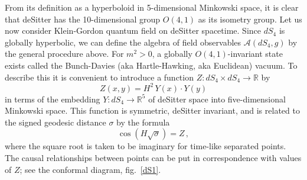 \documentclass[12pt]{article}
\newcommand{\eA}{\mathscr{A}}
\newcommand{\mr}{\mathbb{R}}
\theoremstyle{plain}
\theoremstyle{definition}
\def\ben{\begin{equation}}
\def\een{\end{equation}}
\begin{document}
From its definition as a hyperboloid in 5-dimensional Minkowski space,
it is clear that deSitter has the 10-dimensional group $O(4,1)$ as its isometry
group.
Let us now consider Klein-Gordon quantum field on deSitter
spacetime. Since $dS_4$ is globally hyperbolic, we can define the algebra of field observables $\eA(dS_4,g)$
by the general procedure above. For $m^2 > 0$, a globally $O(4,1)$-invariant state exists
called the Bunch-Davies (aka Hartle-Hawking, aka Euclidean) vacuum. To describe this
it is convenient to introduce a function $Z: dS_4 \times dS_4 \to \mr$
by
\ben\label{Zdef}
Z(x,y) = H^{2}\, Y(x) \cdot Y(y)
\een
in terms of the embedding $Y:dS_4 \to \mr^5$ of deSitter space into
five-dimensional Minkowski space. This function is symmetric, deSitter
invariant, and is related to the signed geodesic distance $\sigma$ by the formula
\ben\label{zsigma}
\cos(H \sqrt{\sigma}) = Z \, ,
\een
where the square root is taken to be imaginary for time-like separated points.
The causal relationships between points can be put in correspondence with values of
$Z$; see the conformal diagram, fig.~\ref{dS1}.
\end{document}
